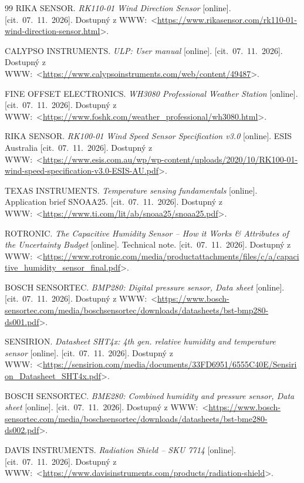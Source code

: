 \documentclass[oneside]{ctuthesis}
\theoremstyle{plain}
\theoremstyle{definition}
\theoremstyle{note}
\begin{document}
\begin{thebibliography}{99}
 RIKA SENSOR. \textit{RK110-01 Wind Direction Sensor} [online]. [cit.~07.~11.~2026]. Dostupný z WWW:~<\url{https://www.rikasensor.com/rk110-01-wind-direction-sensor.html}>.

 CALYPSO INSTRUMENTS. \textit{ULP: User manual} [online]. [cit.~07.~11.~2026]. Dostupný z WWW:~<\url{https://www.calypsoinstruments.com/web/content/49487}>.

 FINE OFFSET ELECTRONICS. \textit{WH3080 Professional Weather Station} [online]. [cit.~07.~11.~2026]. Dostupný z WWW:~<\url{https://www.foshk.com/weather_professional/wh3080.html}>.

 RIKA SENSOR. \textit{RK100-01 Wind Speed Sensor Specification v3.0} [online]. ESIS Australia [cit.~07.~11.~2026]. Dostupný z WWW:~<\url{https://www.esis.com.au/wp/wp-content/uploads/2020/10/RK100-01-wind-speed-specification-v3.0-ESIS-AU.pdf}>.

 TEXAS INSTRUMENTS. \textit{Temperature sensing fundamentals} [online]. Application brief SNOAA25. [cit.~07.~11.~2026]. Dostupný z WWW:~<\url{https://www.ti.com/lit/ab/snoaa25/snoaa25.pdf}>.

 ROTRONIC. \textit{The Capacitive Humidity Sensor -- How it Works \& Attributes of the Uncertainty Budget} [online]. Technical note. [cit.~07.~11.~2026]. Dostupný z WWW:~<\url{https://www.rotronic.com/media/productattachments/files/c/a/capacitive_humidity_sensor_final.pdf}>.

 BOSCH SENSORTEC. \textit{BMP280: Digital pressure sensor, Data sheet} [online]. [cit.~07.~11.~2026]. Dostupný z WWW:~<\url{https://www.bosch-sensortec.com/media/boschsensortec/downloads/datasheets/bst-bmp280-ds001.pdf}>.

 SENSIRION. \textit{Datasheet SHT4x: 4th gen. relative humidity and temperature sensor} [online]. [cit.~07.~11.~2026]. Dostupný z WWW:~<\url{https://sensirion.com/media/documents/33FD6951/6555C40E/Sensirion_Datasheet_SHT4x.pdf}>.

 BOSCH SENSORTEC. \textit{BME280: Combined humidity and pressure sensor, Data sheet} [online]. [cit.~07.~11.~2026]. Dostupný z WWW:~<\url{https://www.bosch-sensortec.com/media/boschsensortec/downloads/datasheets/bst-bme280-ds002.pdf}>.

 DAVIS INSTRUMENTS. \textit{Radiation Shield -- SKU 7714} [online]. [cit.~07.~11.~2026]. Dostupný z WWW:~<\url{https://www.davisinstruments.com/products/radiation-shield}>.


\end{thebibliography}
\end{document}
